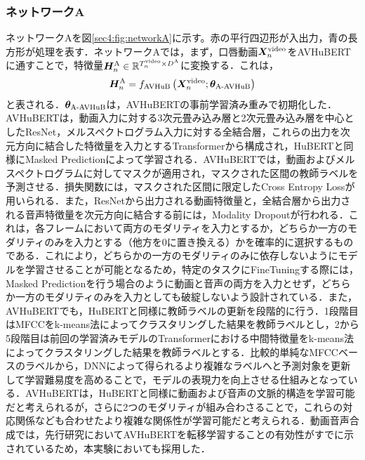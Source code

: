 \subsubsection{ネットワークA}
ネットワークAを図\ref{sec4:fig:networkA}に示す。赤の平行四辺形が入出力，青の長方形が処理を表す．ネットワークAでは，まず，口唇動画$\bm{X}^{\text{video}}_{n}$をAVHuBERTに通すことで，特徴量$\bm{H}^{\text{A}}_{n} \in \mathbb{R}^{T^{\text{video}}_{n} \times D^{\text{A}}}$に変換する．これは，
\begin{equation}
    \bm{H}^{\text{A}}_{n} = f_{\text{AVHuB}}\left(\bm{X}^{\text{video}}_{n}; \bm{\theta}_{\text{A-AVHuB}}\right)
\end{equation}
と表される．$\bm{\theta}_{\text{A-AVHuB}}$は，AVHuBERTの事前学習済み重みで初期化した．AVHuBERTは，動画入力に対する3次元畳み込み層と2次元畳み込み層を中心としたResNet，メルスペクトログラム入力に対する全結合層，これらの出力を次元方向に結合した特徴量を入力とするTransformerから構成され，HuBERTと同様にMasked Predictionによって学習される．AVHuBERTでは，動画およびメルスペクトログラムに対してマスクが適用され，マスクされた区間の教師ラベルを予測させる．損失関数には，マスクされた区間に限定したCross Entropy Lossが用いられる．また，ResNetから出力される動画特徴量と，全結合層から出力される音声特徴量を次元方向に結合する前には，Modality Dropoutが行われる．これは，各フレームにおいて両方のモダリティを入力とするか，どちらか一方のモダリティのみを入力とする（他方を0に置き換える）かを確率的に選択するものである．これにより，どちらかの一方のモダリティのみに依存しないようにモデルを学習させることが可能となるため，特定のタスクにFineTuningする際には，Masked Predictionを行う場合のように動画と音声の両方を入力とせず，どちらか一方のモダリティのみを入力としても破綻しないよう設計されている．また，AVHuBERTでも，HuBERTと同様に教師ラベルの更新を段階的に行う．1段階目はMFCCをk-means法によってクラスタリングした結果を教師ラベルとし，2から5段階目は前回の学習済みモデルのTransformerにおける中間特徴量をk-means法によってクラスタリングした結果を教師ラベルとする．比較的単純なMFCCベースのラベルから，DNNによって得られるより複雑なラベルへと予測対象を更新して学習難易度を高めることで，モデルの表現力を向上させる仕組みとなっている．AVHuBERTは，HuBERTと同様に動画および音声の文脈的構造を学習可能だと考えられるが，さらに2つのモダリティが組み合わさることで，これらの対応関係なども合わせたより複雑な関係性が学習可能だと考えられる．動画音声合成では，先行研究においてAVHuBERTを転移学習することの有効性がすでに示されているため，本実験においても採用した．

